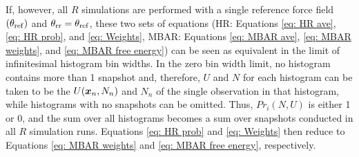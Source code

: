 \documentclass[journal=jced,manuscript=article]{achemso}
\newcommand{\bfv}[1]{{\mbox{\boldmath{$#1$}}}}
\newcommand{\x}{\bfv{x}}
\begin{document}
If, however, all $R$ simulations are performed with a single reference force field $(\theta_{\rm ref})$ and $\theta_{\rm rr} = \theta_{\rm ref}$, these two sets of equations (HR: Equations \ref{eq: HR ave}, \ref{eq: HR prob}, and \ref{eq: Weights}, MBAR: Equations \ref{eq: MBAR ave}, \ref{eq: MBAR weights}, and \ref{eq: MBAR free energy}) can be seen as equivalent in the limit of infinitesimal histogram bin widths. In the zero bin width limit, no histogram contains more than 1 snapshot and, therefore, $U$ and $N$ for each histogram can be taken to be the $U(\x_n,N_n)$ and $N_n$ of the single observation in that histogram, while histograms with no snapshots can be omitted. Thus, $Pr_i(N,U)$ is either 1 or 0, and the sum over all histograms becomes a sum over snapshots conducted in all $R$ simulation runs. Equations \ref{eq: HR prob} and \ref{eq: Weights} then reduce to Equations \ref{eq: MBAR weights} and \ref{eq: MBAR free energy}, respectively.

\end{document}
